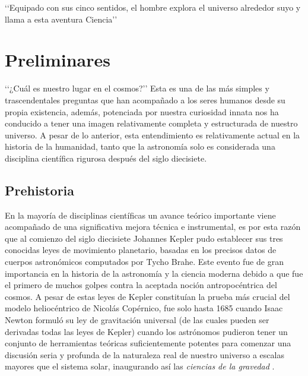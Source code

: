 \begin{savequote}[50mm]
‘‘Equipado con sus cinco sentidos, el hombre explora el universo alrededor 
suyo y llama a esta aventura Ciencia’’ 
\end{savequote}




\chapter{Preliminares}
\label{cha:Introduction}

 
‘‘¿Cuál es nuestro lugar en el cosmos?’’ Esta es una de las más simples
y trascendentales preguntas que han acompañado a los seres humanos
desde su propia existencia, además, potenciada por nuestra curiosidad innata
nos ha conducido a tener una imagen relativamente completa y 
estructurada de nuestro universo. A pesar de lo anterior, esta entendimiento 
es relativamente actual en la historia de la humanidad, tanto que la 
astronomía solo es considerada una disciplina científica rigurosa después 
del siglo diecisiete.







\section{Prehistoria}
\label{sec:Prehistory}


En la mayoría de disciplinas científicas un avance teórico importante 
viene acompañado de una significativa mejora técnica e instrumental, es 
por esta razón que al comienzo del siglo diecisiete Johannes Kepler pudo 
establecer sus tres conocidas leyes de movimiento planetario, basadas en 
los precisos datos de cuerpos astronómicos computados por Tycho Brahe. Este 
evento fue de gran importancia en la historia de la astronomía y la ciencia 
moderna debido a que fue el primero de muchos golpes contra la aceptada
noción antropocéntrica del cosmos. A pesar de estas leyes de Kepler 
constituían la prueba más crucial del modelo heliocéntrico de Nicolás 
Copérnico, fue solo hasta 1685 cuando Isaac Newton formuló su ley de 
gravitación universal (de las cuales pueden ser derivadas todas las leyes
de Kepler) cuando los astrónomos pudieron tener un conjunto de herramientas
teóricas suficientemente potentes para comenzar una discusión seria y 
profunda de la naturaleza real de nuestro universo a escalas mayores que el 
sistema solar, inaugurando así las \textit{ciencias de la gravedad} 
\cite{longair2008}.


